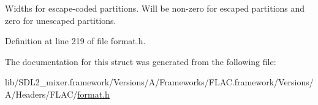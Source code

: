 Widths for escape-\/coded partitions. Will be non-\/zero for escaped partitions and zero for unescaped partitions. 

Definition at line 219 of file format.\+h.



The documentation for this struct was generated from the following file\+:\begin{DoxyCompactItemize}
\item 
lib/\+S\+D\+L2\+\_\+mixer.\+framework/\+Versions/\+A/\+Frameworks/\+F\+L\+A\+C.\+framework/\+Versions/\+A/\+Headers/\+F\+L\+A\+C/\mbox{\hyperlink{format_8h}{format.\+h}}\end{DoxyCompactItemize}

